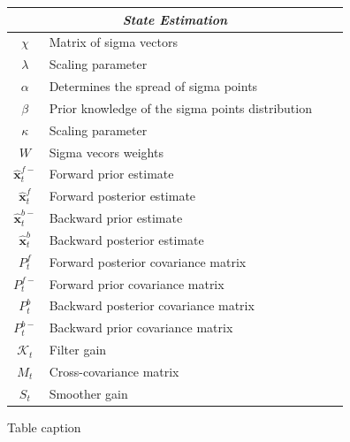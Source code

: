 \documentclass[10pt]{article}
\begin{document}
\begin{table}[!ht]
\begin{tabular}{|c|l|c|c|}
	\hline
	\multicolumn{4}{|c|}{\emph{State Estimation}} \\
	\hline
	$\chi$ & Matrix of sigma vectors & &\\
	$\lambda$& Scaling parameter & &\\
	$\alpha$& Determines the spread of sigma points & &\\
	$\beta$& Prior knowledge of the sigma points distribution & &\\
	$\kappa$& Scaling parameter & & \\
	$W$& Sigma vecors weights & & \\
   	$\hat{\mathbf{x}}_t^{f-}$ & Forward prior estimate & & \\
   	$\hat{\mathbf{x}}_t^f$ & Forward posterior estimate & & \\
   	$\hat{\mathbf{x}}_t^{b-}$ & Backward prior estimate & & \\
   	$\hat{\mathbf{x}}_t^{b}$ & Backward posterior estimate & & \\
   	$P^f_t$ & Forward posterior covariance matrix & & \\
   	$P^{f-}_t$ & Forward prior covariance matrix & & \\
   	$P^b_t$ & Backward posterior covariance matrix & & \\
   	$P^{b-}_t$ & Backward prior covariance matrix & & \\
	$\mathcal K_{t} $& Filter gain & & \\
	$M_t$& Cross-covariance matrix & & \\
	$S_t$& Smoother gain & & \\	
	\hline
\end{tabular}
\begin{flushleft}Table caption
\end{flushleft}
\label{tab:label}
\end{table}

\end{document}
